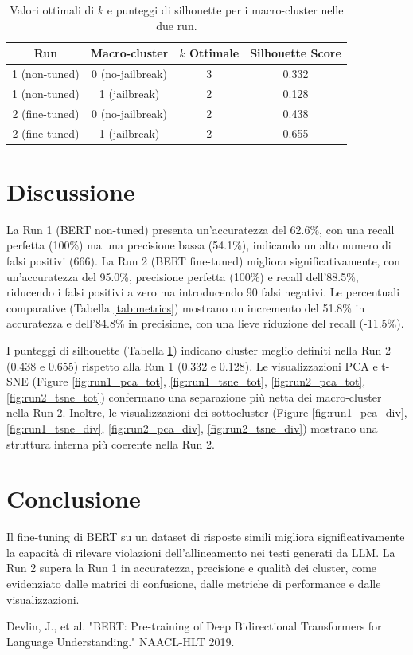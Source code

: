 \documentclass[a4paper,12pt]{article}
\begin{document}
\begin{table}[h]
    \centering
    \begin{tabular}{c|c|c|c}
        \toprule
        Run & Macro-cluster & \(k\) Ottimale & Silhouette Score \\
        \midrule
        1 (non-tuned) & 0 (no-jailbreak) & 3 & 0.332 \\
        1 (non-tuned) & 1 (jailbreak) & 2 & 0.128 \\
        2 (fine-tuned) & 0 (no-jailbreak) & 2 & 0.438 \\
        2 (fine-tuned) & 1 (jailbreak) & 2 & 0.655 \\
        \bottomrule
    \end{tabular}
    \caption{Valori ottimali di \(k\) e punteggi di silhouette per i macro-cluster nelle due run.}
    \label{tab:elbow_silhouette}
\end{table}

\section{Discussione}
La Run 1 (BERT non-tuned) presenta un'accuratezza del 62.6\%, con una recall perfetta (100\%) ma una precisione bassa (54.1\%), indicando un alto numero di falsi positivi (666). La Run 2 (BERT fine-tuned) migliora significativamente, con un'accuratezza del 95.0\%, precisione perfetta (100\%) e recall dell'88.5\%, riducendo i falsi positivi a zero ma introducendo 90 falsi negativi. Le percentuali comparative (Tabella \ref{tab:metrics}) mostrano un incremento del 51.8\% in accuratezza e dell'84.8\% in precisione, con una lieve riduzione del recall (-11.5\%).

I punteggi di silhouette (Tabella \ref{tab:elbow_silhouette}) indicano cluster meglio definiti nella Run 2 (0.438 e 0.655) rispetto alla Run 1 (0.332 e 0.128). Le visualizzazioni PCA e t-SNE (Figure \ref{fig:run1_pca_tot}, \ref{fig:run1_tsne_tot}, \ref{fig:run2_pca_tot}, \ref{fig:run2_tsne_tot}) confermano una separazione più netta dei macro-cluster nella Run 2. Inoltre, le visualizzazioni dei sottocluster (Figure \ref{fig:run1_pca_div}, \ref{fig:run1_tsne_div}, \ref{fig:run2_pca_div}, \ref{fig:run2_tsne_div}) mostrano una struttura interna più coerente nella Run 2.

\section{Conclusione}
Il fine-tuning di BERT su un dataset di risposte simili migliora significativamente la capacità di rilevare violazioni dell'allineamento nei testi generati da LLM. La Run 2 supera la Run 1 in accuratezza, precisione e qualità dei cluster, come evidenziato dalle matrici di confusione, dalle metriche di performance e dalle visualizzazioni.

\begin{thebibliography}{9}
 Devlin, J., et al. "BERT: Pre-training of Deep Bidirectional Transformers for Language Understanding." NAACL-HLT 2019.
\end{thebibliography}
\end{document}
